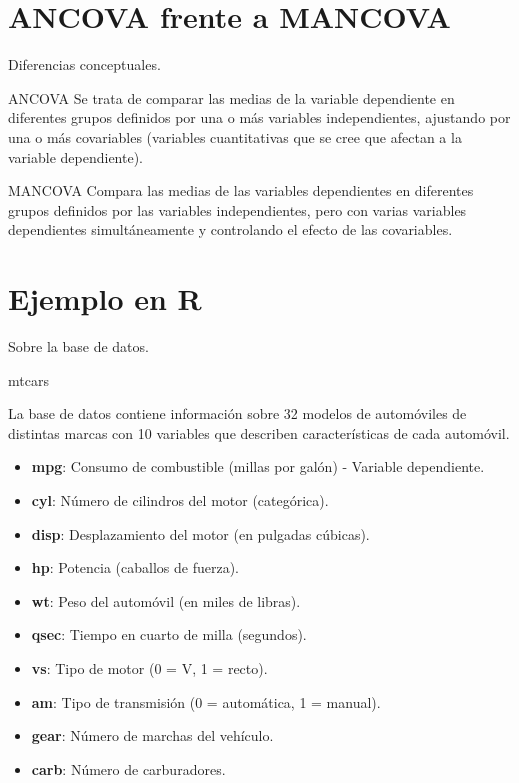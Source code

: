 \documentclass[11pt]{beamer}
\begin{document}
\section{ANCOVA frente a MANCOVA}
\begin{frame}{Diferencias conceptuales.}
	\begin{block}{ANCOVA}
		Se trata de comparar las medias de la variable dependiente en diferentes grupos definidos por una o más variables independientes, ajustando por una o más covariables (variables cuantitativas que se cree que afectan a la variable dependiente).
	\end{block}
	\begin{block}{MANCOVA}
		Compara las medias de las variables dependientes en diferentes grupos definidos por las variables independientes, pero con varias variables dependientes simultáneamente y controlando el efecto de las covariables.
	\end{block}
\end{frame}

\section{Ejemplo en R}
\begin{frame}{Sobre la base de datos.}
	\begin{block}{mtcars}
		\begin{small}
			La base de datos contiene información sobre 32 modelos de automóviles de distintas marcas con 10 variables que describen características de cada automóvil.
		\end{small}
		
	\end{block}
	
	\begin{itemize}
        \item \textbf{mpg}: Consumo de combustible (millas por galón) - Variable dependiente.
        \item \textbf{cyl}: Número de cilindros del motor (categórica).
        \item \textbf{disp}: Desplazamiento del motor (en pulgadas cúbicas).
        \item \textbf{hp}: Potencia (caballos de fuerza).
        \item \textbf{wt}: Peso del automóvil (en miles de libras).
        \item \textbf{qsec}: Tiempo en cuarto de milla (segundos).
        \item \textbf{vs}: Tipo de motor (0 = V, 1 = recto).
        \item \textbf{am}: Tipo de transmisión (0 = automática, 1 = manual).
        \item \textbf{gear}: Número de marchas del vehículo.
        \item \textbf{carb}: Número de carburadores.
    \end{itemize}

\end{frame}
\end{document}
